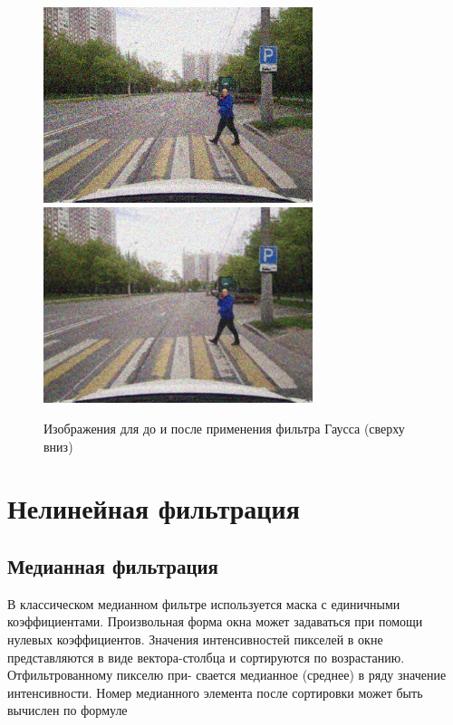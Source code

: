 \begin{figure}[ht]
    \centering
    \includegraphics[width=0.7\textwidth]{../outputs/image_gauss_noise.png}
    \includegraphics[width=0.7\textwidth]{../outputs/image_gaussian_filter.png}
    \caption{Изображения для до и после применения фильтра Гаусса (сверху вниз)}
    \label{fig:stitch_images}
\end{figure}

\pagebreak

\section{Нелинейная фильтрация}

\subsection{Медианная фильтрация}

В классическом медианном фильтре используется маска с единичными коэффициентами. Произвольная форма окна 
может задаваться при помощи нулевых коэффициентов. Значения интенсивностей пикселей в окне представляются 
в виде вектора-столбца и сортируются по возрастанию. Отфильтрованному пикселю при-
свается медианное (среднее) в ряду значение интенсивности. Номер медианного элемента после сортировки может быть вычислен
по формуле 

